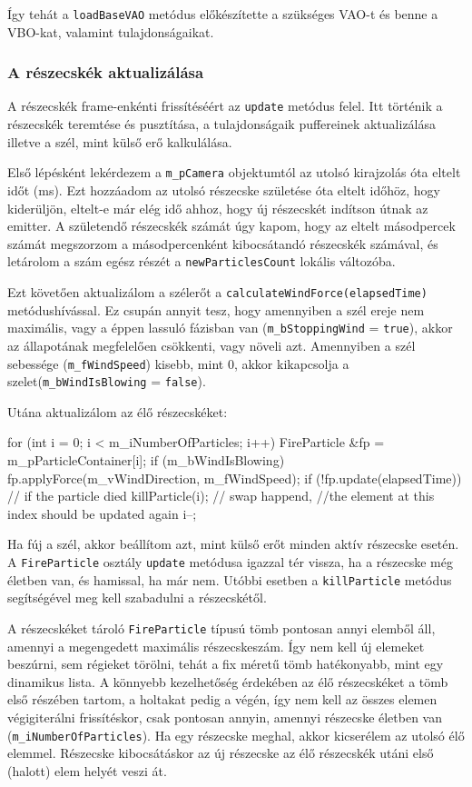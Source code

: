 Így tehát a \texttt{loadBaseVAO} metódus előkészítette a szükséges VAO-t és benne a VBO-kat, valamint tulajdonságaikat.

\subsubsection{A részecskék aktualizálása}
A részecskék frame-enkénti frissítéséért az \texttt{update} metódus felel. Itt történik a részecskék teremtése és pusztítása, a tulajdonságaik puffereinek aktualizálása illetve a szél, mint külső erő kalkulálása.

Első lépésként lekérdezem a \texttt{m\_pCamera} objektumtól az utolsó kirajzolás óta eltelt időt (ms). Ezt hozzáadom az utolsó részecske születése óta eltelt időhöz, hogy kiderüljön, eltelt-e már elég idő ahhoz, hogy új részecskét indítson útnak az emitter. A születendő részecskék számát úgy kapom, hogy az eltelt másodpercek számát megszorzom a másodpercenként kibocsátandó részecskék számával, és letárolom a szám egész részét a \texttt{newParticlesCount} lokális változóba.

Ezt követően aktualizálom a szélerőt a \texttt{calculateWindForce(elapsedTime)} metódushívással. Ez csupán annyit tesz, hogy amennyiben a szél ereje nem maximális, vagy a éppen lassuló fázisban van (\texttt{m\_bStoppingWind} = \texttt{true}), akkor az állapotának megfelelően csökkenti, vagy növeli azt. Amennyiben a szél sebessége (\texttt{m\_fWindSpeed}) kisebb, mint $0$, akkor kikapcsolja a szelet(\texttt{m\_bWindIsBlowing} = \texttt{false}).

Utána aktualizálom az élő részecskéket:
\begin{cpp}
for (int i = 0; i < m_iNumberOfParticles; i++)
{
	FireParticle &fp = m_pParticleContainer[i];
	if (m_bWindIsBlowing) {
		fp.applyForce(m_vWindDirection, m_fWindSpeed);
	}
	if (!fp.update(elapsedTime)) {
		// if the particle died
		killParticle(i);
		// swap happend, 
		//the element at this index should be updated again
		i--;
	}
}
\end{cpp}
Ha fúj a szél, akkor beállítom azt, mint külső erőt minden aktív részecske esetén. A \texttt{FireParticle} osztály \texttt{update} metódusa igazzal tér vissza, ha a részecske még életben van, és hamissal, ha már nem. Utóbbi esetben a \texttt{killParticle} metódus segítségével meg kell szabadulni a részecskétől. 

A részecskéket tároló \texttt{FireParticle} típusú tömb pontosan annyi elemből áll, amennyi a megengedett maximális részecskeszám. Így nem kell új elemeket beszúrni, sem régieket törölni, tehát a fix méretű tömb hatékonyabb, mint egy dinamikus lista. A könnyebb kezelhetőség érdekében az élő részecskéket a tömb első részében tartom, a holtakat pedig a végén, így nem kell az összes elemen végigiterálni frissítéskor, csak pontosan annyin, amennyi részecske életben van (\texttt{m\_iNumberOfParticles}). Ha egy részecske meghal, akkor kicserélem az utolsó élő elemmel. Részecske kibocsátáskor az új részecske az élő részecskék utáni első (halott) elem helyét veszi át. 

